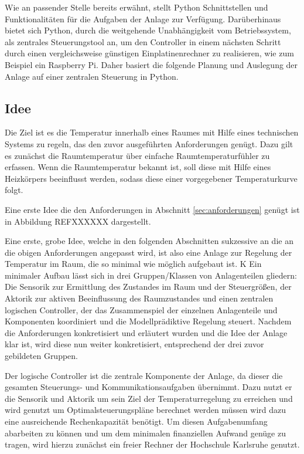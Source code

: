 Wie an passender Stelle bereits erwähnt, stellt Python Schnittstellen und Funktionalitäten für die Aufgaben der Anlage zur Verfügung. Darüberhinaus bietet sich Python, durch die weitgehende Unabhängigkeit vom Betriebssystem, als zentrales Steuerungstool an, um den Controller in einem nächsten Schritt durch einen vergleichsweise günstigen Einplatinenrechner zu realisieren, wie zum Beispiel ein Raspberry Pi. Daher basiert die folgende Planung und Auslegung der Anlage auf einer zentralen Steuerung in Python.

\subsection{Idee}

Die Ziel ist es die Temperatur innerhalb eines Raumes mit Hilfe eines technischen Systems zu regeln, das den zuvor ausgeführten Anforderungen genügt. Dazu gilt es zunächst die Raumtemperatur über einfache Raumtemperaturfühler zu erfassen. Wenn die Raumtemperatur bekannt ist, soll diese mit Hilfe eines Heizkörpers beeinflusst werden, sodass diese einer vorgegebener Temperaturkurve folgt.

Eine erste Idee die den Anforderungen in Abschnitt \ref{sec:anforderungen} genügt ist in Abbildung REFXXXXXX dargestellt.

Eine erste, grobe Idee, welche in den folgenden Abschnitten sukzessive an die an die obigen Anforderungen angepasst wird, ist also eine Anlage zur Regelung der Temperatur im Raum, die so minimal wie möglich aufgebaut ist. K Ein minimaler Aufbau lässt sich in drei Gruppen/Klassen von Anlagenteilen gliedern: Die Sensorik zur Ermittlung des Zustandes im Raum und der Steuergrößen, der Aktorik zur aktiven Beeinflussung des Raumzustandes und einen zentralen logischen Controller, der das Zusammenspiel der einzelnen Anlagenteile und Komponenten koordiniert und die Modellprädiktive Regelung steuert.
Nachdem die Anforderungen konkretisiert und erläutert wurden und die Idee der Anlage klar ist, wird diese nun weiter konkretisiert, entsprechend der drei zuvor gebildeten Gruppen.

Der logische Controller ist die zentrale Komponente der Anlage, da dieser die gesamten Steuerungs- und Kommunikationsaufgaben übernimmt. Dazu nutzt er die Sensorik und Aktorik um sein Ziel der Temperaturregelung zu erreichen und wird genutzt um  Optimalsteuerungspläne berechnet werden müssen wird dazu eine ausreichende Rechenkapazität benötigt. Um diesen Aufgabenumfang abarbeiten zu können und um dem minimalen finanziellen Aufwand genüge zu tragen, wird hierzu zunächst ein freier Rechner der Hochschule Karlsruhe genutzt.

